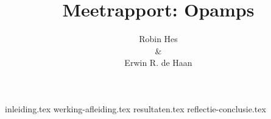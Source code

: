 \documentclass{report}
\title{Meetrapport: Opamps}
\author{Robin Hes\\\&\\Erwin R. de Haan}
\begin{document}
\maketitle
\tableofcontents

{inleiding.tex}
{werking-afleiding.tex}
{resultaten.tex}
{reflectie-conclusie.tex}
\printbibliography
\end{document}
